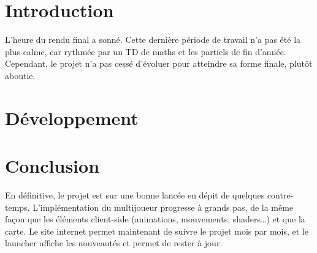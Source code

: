 \documentclass[french, 15pt]{article}
\begin{document}


\tableofcontents
\newpage

\pagestyle{fancy}

\section{Introduction}

L'heure du rendu final a sonné. Cette dernière période de travail n'a pas été la plus calme, car rythmée par un TD de maths et les partiels de fin d'année.
Cependant, le projet n'a pas cessé d'évoluer pour atteindre sa forme finale, plutôt aboutie.

\newpage
\section{Développement}










\newpage
\section{Conclusion}
En définitive, le projet est sur une bonne lancée en dépit de quelques contre-temps.
L’implémentation du multijoueur progresse à grands pas, de la même façon que les éléments
client-side (animations, mouvements, shaders…) et que la carte. Le site internet permet
maintenant de suivre le projet mois par mois, et le launcher affiche les nouveautés et permet de rester à jour.
\listoffigures
\listoftables
\end{document}
